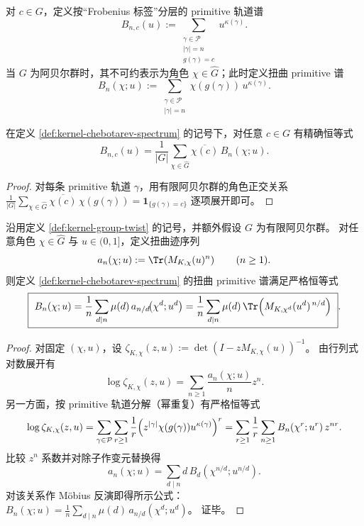 \begin{definition}\label{def:kernel-chebotarev-spectrum}
对 $c\in G$，定义按“Frobenius 标签”分层的 primitive 轨道谱
\[
B_{n,c}(u):=\sum_{\substack{\gamma\in\mathcal{P}\\|\gamma|=n\\g(\gamma)=c}}u^{\kappa(\gamma)}.
\]
当 $G$ 为阿贝尔群时，其不可约表示为角色 $\chi\in\widehat G$；此时定义扭曲 primitive 谱
\[
B_n(\chi;u):=\sum_{\substack{\gamma\in\mathcal{P}\\|\gamma|=n}}\chi(g(\gamma))\,u^{\kappa(\gamma)}.
\]
\end{definition}

\begin{proposition}\label{prop:kernel-chebotarev-fourier}
在定义 \ref{def:kernel-chebotarev-spectrum} 的记号下，对任意 $c\in G$ 有精确恒等式
\[
B_{n,c}(u)=\frac{1}{|G|}\sum_{\chi\in\widehat G}\overline{\chi(c)}\,B_n(\chi;u).
\]
\end{proposition}

\begin{proof}
对每条 primitive 轨道 $\gamma$，用有限阿贝尔群的角色正交关系
\(
\frac{1}{|G|}\sum_{\chi\in\widehat G}\overline{\chi(c)}\,\chi(g(\gamma))=\mathbf{1}_{\{g(\gamma)=c\}}
\)
逐项展开即可。
\end{proof}

\begin{proposition}\label{prop:kernel-chebotarev-mobius-adams}
沿用定义 \ref{def:kernel-group-twist} 的记号，并额外假设 \(G\) 为有限阿贝尔群。
对任意角色 \(\chi\in\widehat G\) 与 \(u\in(0,1]\)，定义扭曲迹序列
\[
a_n(\chi;u):=\Tr\!\left(M_{K,\chi}(u)^n\right)\qquad(n\ge 1).
\]
则定义 \ref{def:kernel-chebotarev-spectrum} 的扭曲 primitive 谱满足严格恒等式
\[
\boxed{\ 
B_n(\chi;u)=\frac{1}{n}\sum_{d\mid n}\mu(d)\,a_{n/d}\!\bigl(\chi^{d};u^{d}\bigr)
=\frac{1}{n}\sum_{d\mid n}\mu(d)\,\Tr\!\left(M_{K,\chi^{d}}(u^{d})^{\,n/d}\right)\ }.
\]
\end{proposition}
\begin{proof}
对固定 \((\chi,u)\)，设
\(
\zeta_{K,\chi}(z,u):=\det(I-zM_{K,\chi}(u))^{-1}
\)。
由行列式对数展开有
\[
\log\zeta_{K,\chi}(z,u)
=\sum_{n\ge 1}\frac{a_n(\chi;u)}{n}z^n.
\]
另一方面，按 primitive 轨道分解（幂重复）有严格恒等式
\[
\log\zeta_{K,\chi}(z,u)
=\sum_{\gamma\in\mathcal{P}}\sum_{r\ge 1}\frac{1}{r}\Bigl(z^{|\gamma|}\chi(g(\gamma))u^{\kappa(\gamma)}\Bigr)^r
=\sum_{r\ge 1}\frac{1}{r}\sum_{n\ge 1}B_n(\chi^r;u^r)\,z^{nr}.
\]
比较 \(z^n\) 系数并对除子作变元替换得
\[
a_n(\chi;u)=\sum_{d\mid n} d\,B_d(\chi^{n/d};u^{n/d}).
\]
对该关系作 Möbius 反演即得所示公式：
\(
B_n(\chi;u)=\frac{1}{n}\sum_{d\mid n}\mu(d)\,a_{n/d}(\chi^d;u^d)
\)。
证毕。
\end{proof}

